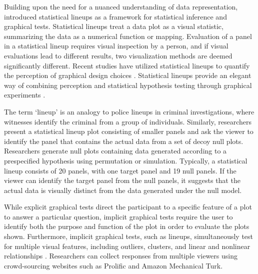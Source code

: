 \documentclass[12pt]{article}
\begin{document}
Building upon the need for a nuanced understanding of data
representation, \citet{buja_statistical_2009} introduced statistical
lineups as a framework for statistical inference and graphical tests.
Statistical lineups treat a data plot as a visual statistic, summarizing
the data as a numerical function or mapping. Evaluation of a panel in a
statistical lineup requires visual inspection by a person, and if visual
evaluations lead to different results, two visualization methods are
deemed significantly different. Recent studies have utilized statistical
lineups to quantify the perception of graphical design choices
\citep{hofmann_graphical_2012, loy_model_2017, loy_variations_2016, vanderplas_clusters_2017}.
Statistical lineups provide an elegant way of combining perception and
statistical hypothesis testing through graphical experiments
\citep{majumder_validation_2013, vanderplas_testing_2020, wickham2010graphical}.

The term `lineup' is an analogy to police lineups in criminal
investigations, where witnesses identify the criminal from a group of
individuals. Similarly, researchers present a statistical lineup plot
consisting of smaller panels and ask the viewer to identify the panel
that contains the actual data from a set of decoy null plots.
Researchers generate null plots containing data generated according to a
prespecified hypothesis using permutation or simulation. Typically, a
statistical lineup consists of 20 panels, with one target panel and 19
null panels. If the viewer can identify the target panel from the null
panels, it suggests that the actual data is visually distinct from the
data generated under the null model.

While explicit graphical tests direct the participant to a specific
feature of a plot to answer a particular question, implicit graphical
tests require the user to identify both the purpose and function of the
plot in order to evaluate the plots shown. Furthermore, implicit
graphical tests, such as lineups, simultaneously test for multiple
visual features, including outliers, clusters, and linear and nonlinear
relationships \citep{vanderplas2015spatial}. Researchers can collect
responses from multiple viewers using crowd-sourcing websites such as
Prolific and Amazon Mechanical Turk.
\end{document}
